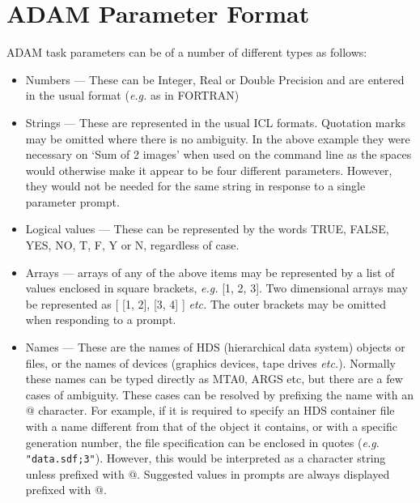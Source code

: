\documentclass[twoside,11pt]{report}
\newcommand{\xlabel}[1]{}
\begin{document}
\section{\xlabel{adam_parameter_format}ADAM Parameter Format}
                 
ADAM task parameters can be of a number of different types as follows:

\begin{itemize}

\item Numbers --- These can be Integer, Real or Double Precision and are
entered in the usual format ({\em e.g.} as in FORTRAN)

\item Strings --- These are represented in the usual ICL formats. Quotation
marks may be omitted where there is no ambiguity. In the above example they
were necessary on `Sum of 2 images' when used on the command line as the spaces
would otherwise make it appear to be four different parameters. However, they
would not be needed for the same string in response to a single parameter 
prompt.

\item Logical values --- These can be represented by the words TRUE, FALSE,
YES, NO, T, F, Y or N, regardless of case.

\item Arrays --- arrays of any of the above items may be represented by
a list of values enclosed in square brackets, {\em e.g.} [1, 2, 3]. 
Two dimensional arrays may be represented as [ [1, 2], [3, 4] ] {\em etc.}
The outer brackets may be omitted when responding to a prompt.

\item Names --- These are the names of HDS (hierarchical data system) objects
or files, or the names of devices (graphics devices, tape drives {\em etc.}).
Normally these names can be typed directly as MTA0, ARGS etc, but there
are a few cases of ambiguity.
These cases can be resolved by prefixing the name with an @ character.
For example, if it is required to specify an HDS container file with a name
different from that of the object it contains, or with a specific generation
number, the file specification can be enclosed in quotes
({\em e.g.} \verb+"data.sdf;3"+). 
However, this would be interpreted as a character string unless prefixed with
@.
Suggested values in prompts are always displayed prefixed with @.

\end{itemize}
\end{document}
